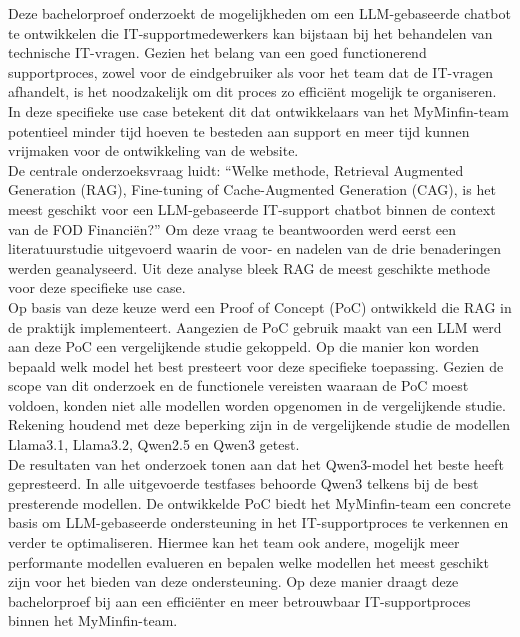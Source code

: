 Deze bachelorproef onderzoekt de mogelijkheden om een LLM-gebaseerde chatbot te ontwikkelen die IT-supportmedewerkers kan bijstaan bij het behandelen van technische IT-vragen. Gezien het belang van een goed functionerend supportproces, zowel voor de eindgebruiker als voor het team dat de IT-vragen afhandelt, is het noodzakelijk om dit proces zo efficiënt mogelijk te organiseren. In deze specifieke use case betekent dit dat ontwikkelaars van het MyMinfin-team potentieel minder tijd hoeven te besteden aan support en meer tijd kunnen vrijmaken voor de ontwikkeling van de website.
\\[1em]
De centrale onderzoeksvraag luidt: “Welke methode, Retrieval Augmented Generation (RAG), Fine-tuning of Cache-Augmented Generation (CAG), is het meest geschikt voor een LLM-gebaseerde IT-support chatbot binnen de context van de FOD Financiën?” Om deze vraag te beantwoorden werd eerst een literatuurstudie uitgevoerd waarin de voor- en nadelen van de drie benaderingen werden geanalyseerd. Uit deze analyse bleek RAG de meest geschikte methode voor deze specifieke use case.
\\[1em]
Op basis van deze keuze werd een Proof of Concept (PoC) ontwikkeld die RAG in de praktijk implementeert. Aangezien de PoC gebruik maakt van een LLM werd aan deze PoC een vergelijkende studie gekoppeld. Op die manier kon worden bepaald welk model het best presteert voor deze specifieke toepassing. Gezien de scope van dit onderzoek en de functionele vereisten waaraan de PoC moest voldoen, konden niet alle modellen worden opgenomen in de vergelijkende studie. Rekening houdend met deze beperking zijn in de vergelijkende studie de modellen Llama3.1, Llama3.2, Qwen2.5 en Qwen3 getest.
\\[1em]
De resultaten van het onderzoek tonen aan dat het Qwen3-model het beste heeft gepresteerd. In alle uitgevoerde testfases behoorde Qwen3 telkens bij de best presterende modellen. De ontwikkelde PoC biedt het MyMinfin-team een concrete basis om LLM-gebaseerde ondersteuning in het IT-supportproces te verkennen en verder te optimaliseren. Hiermee kan het team ook andere, mogelijk meer performante modellen evalueren en bepalen welke modellen het meest geschikt zijn voor het bieden van deze ondersteuning. Op deze manier draagt deze bachelorproef bij aan een efficiënter en meer betrouwbaar IT-supportproces binnen het MyMinfin-team.